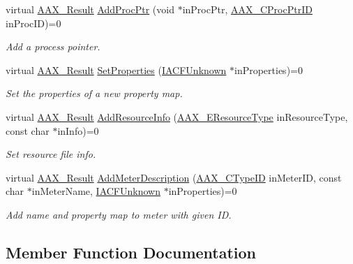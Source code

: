 \begin{DoxyCompactItemize}
virtual \hyperlink{a00149_a4d8f69a697df7f70c3a8e9b8ee130d2f}{A\+A\+X\+\_\+\+Result} \hyperlink{a00057_a7f33575a0f17b9e869401658b193b978}{Add\+Proc\+Ptr} (void $\ast$in\+Proc\+Ptr, \hyperlink{a00163_af0682195d377392ad356fd2b00c36892}{A\+A\+X\+\_\+\+C\+Proc\+Ptr\+I\+D} in\+Proc\+I\+D)=0
\begin{DoxyCompactList}\small\item\em Add a process pointer. \end{DoxyCompactList}\item 
virtual \hyperlink{a00149_a4d8f69a697df7f70c3a8e9b8ee130d2f}{A\+A\+X\+\_\+\+Result} \hyperlink{a00057_a840a5ddf4d0e94d257709aa67cd29b23}{Set\+Properties} (\hyperlink{a00146}{I\+A\+C\+F\+Unknown} $\ast$in\+Properties)=0
\begin{DoxyCompactList}\small\item\em Set the properties of a new property map. \end{DoxyCompactList}\item 
virtual \hyperlink{a00149_a4d8f69a697df7f70c3a8e9b8ee130d2f}{A\+A\+X\+\_\+\+Result} \hyperlink{a00057_a567d1b726a83de8553275300d9cbb763}{Add\+Resource\+Info} (\hyperlink{a00206_ae2805e88175d975589153a04e42898bb}{A\+A\+X\+\_\+\+E\+Resource\+Type} in\+Resource\+Type, const char $\ast$in\+Info)=0
\begin{DoxyCompactList}\small\item\em Set resource file info. \end{DoxyCompactList}\item 
virtual \hyperlink{a00149_a4d8f69a697df7f70c3a8e9b8ee130d2f}{A\+A\+X\+\_\+\+Result} \hyperlink{a00057_afa79bd68910778239c241fd1d81fef09}{Add\+Meter\+Description} (\hyperlink{a00149_ac678f9c1fbcc26315d209f71a147a175}{A\+A\+X\+\_\+\+C\+Type\+I\+D} in\+Meter\+I\+D, const char $\ast$in\+Meter\+Name, \hyperlink{a00146}{I\+A\+C\+F\+Unknown} $\ast$in\+Properties)=0
\begin{DoxyCompactList}\small\item\em Add name and property map to meter with given I\+D. \end{DoxyCompactList}\end{DoxyCompactItemize}


\subsection{Member Function Documentation}
\hypertarget{a00057_a9e2eabbcaa46ada4b5f9bab2663f8a9f}{}
